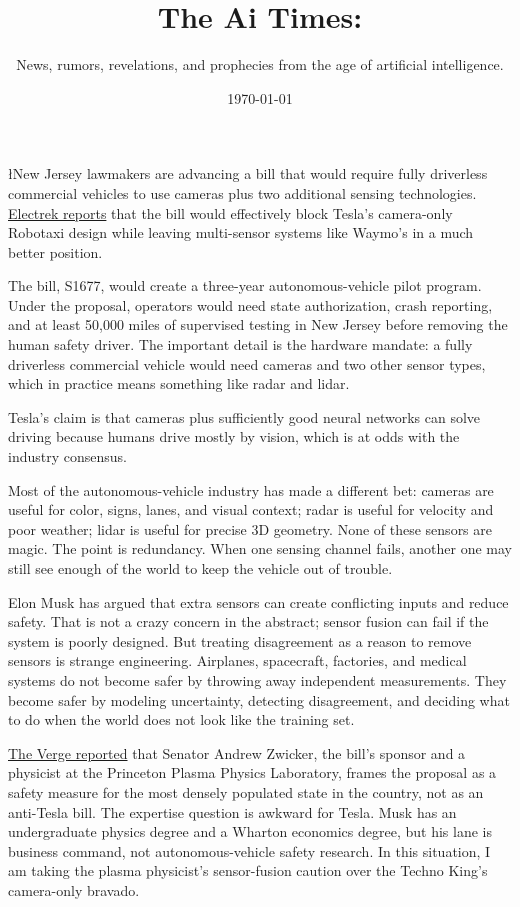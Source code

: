 \documentclass{news}
\title    {The Ai Times:}
\subtitle {News, rumors, revelations, and prophecies from the age of artificial intelligence.}
\date     {\today}
\begin{document}

{\l{N}ew Jersey lawmakers are advancing a bill that would require fully driverless commercial vehicles to use cameras plus two additional sensing technologies. \href{https://electrek.co/2026/07/09/new-jersey-bill-tesla-camera-robotaxi/}{Electrek reports} that the bill would effectively block Tesla's camera-only Robotaxi design while leaving multi-sensor systems like Waymo's in a much better position.
\par}

The bill, S1677, would create a three-year autonomous-vehicle pilot program. Under the proposal, operators would need state authorization, crash reporting, and at least 50,000 miles of supervised testing in New Jersey before removing the human safety driver. The important detail is the hardware mandate: a fully driverless commercial vehicle would need cameras and two other sensor types, which in practice means something like radar and lidar.

Tesla's claim is that cameras plus sufficiently good neural networks can solve driving because humans drive mostly by vision, which is at odds with the industry consensus.

Most of the autonomous-vehicle industry has made a different bet: cameras are useful for color, signs, lanes, and visual context; radar is useful for velocity and poor weather; lidar is useful for precise 3D geometry. None of these sensors are magic. The point is redundancy. When one sensing channel fails, another one may still see enough of the world to keep the vehicle out of trouble.

Elon Musk has argued that extra sensors can create conflicting inputs and reduce safety. That is not a crazy concern in the abstract; sensor fusion can fail if the system is poorly designed. But treating disagreement as a reason to remove sensors is strange engineering. Airplanes, spacecraft, factories, and medical systems do not become safer by throwing away independent measurements. They become safer by modeling uncertainty, detecting disagreement, and deciding what to do when the world does not look like the training set.

\href{https://www.theverge.com/transportation/962309/new-jersey-robotaxi-bill-lidar-tesla}{The Verge reported} that Senator Andrew Zwicker, the bill's sponsor and a physicist at the Princeton Plasma Physics Laboratory, frames the proposal as a safety measure for the most densely populated state in the country, not as an anti-Tesla bill. The expertise question is awkward for Tesla. Musk has an undergraduate physics degree and a Wharton economics degree, but his lane is business command, not autonomous-vehicle safety research. In this situation, I am taking the plasma physicist's sensor-fusion caution over the Techno King's camera-only bravado.
\end{document}
